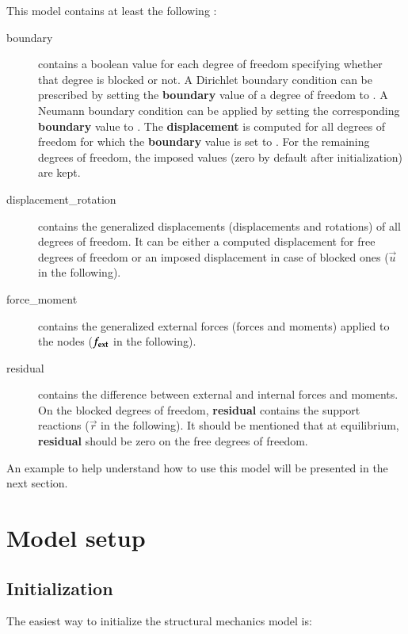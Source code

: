 \vspace{1cm}
This model contains at least the following :
\begin{description}
\item[boundary]  contains a  boolean  value for  each  degree of  freedom
  specifying  whether  that degree  is  blocked  or  not. A  Dirichlet  boundary
  condition can be prescribed by setting the \textbf{boundary} value of a degree
  of freedom to  .  A Neumann boundary condition  can  be applied
  by setting the corresponding  \textbf{boundary} value to  .
  The \textbf{displacement} is computed for all degrees of freedom for which the \textbf{boundary} value is set to . For the remaining degrees of freedom, the imposed values (zero by default after initialization) are kept.
  

  
\item[displacement\_rotation]  contains  the  generalized displacements (displacements and rotations)  of  all
  degrees of freedom. It can be  either a computed displacement for free degrees
  of freedom  or an imposed displacement  in case of blocked  ones ($\vec{u}$ in
  the following).
  
\item[force\_moment]  contains the  generalized external  forces (forces and moments) applied  to the
  nodes ($\boldsymbol{f_{{\mathrm{ext}}}}$ in the following).
  
\item[residual] contains the difference between external and internal forces and
  moments. On the blocked degrees of freedom, \textbf{residual} contains the support
  reactions   ($\vec{r}$ in  the following).   It should  be mentioned  that at
  equilibrium, \textbf{residual} should be zero on the free degrees of freedom.
\end{description}

An example to help understand how  to use this model will be presented in the
next section.

\section{Model setup}
\label{sec:structMechMod:setup}

\subsection{Initialization}
The easiest way to initialize the structural mechanics model is:
%  
%
%

